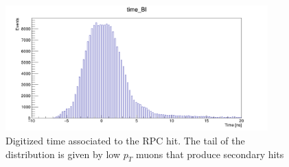 \begin{figure}[!h]
	\centering
	\includegraphics[width=0.9\textwidth]{Chapters/CH3/figures/time_BI}
	\caption{Digitized time associated to the RPC hit. The tail of the distribution is given by low 
		$p_T$ muons that produce secondary hits}
	\label{fig:time_BI}
\end{figure}


